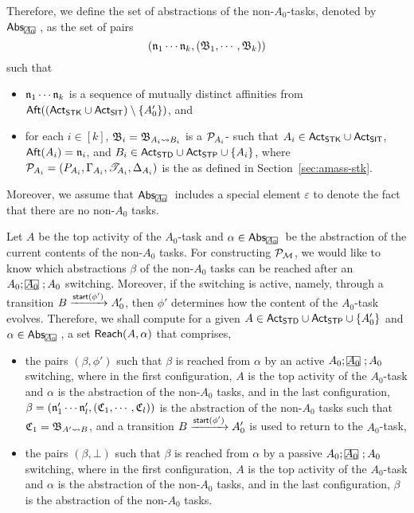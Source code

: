 Therefore, we define the set of abstractions of the non-$A_0$-tasks, denoted by $\abs_{\mhcancel{A_0}}$, as the set of pairs 
\[(\mathfrak{n}_1 \cdots \mathfrak{n}_k, ({\mathfrak{B} }_1, \cdots, {\mathfrak{B} }_k))\]
such that 
\begin{itemize}
\item $\mathfrak{n}_1 \cdots \mathfrak{n}_k$ is a sequence of mutually distinct affinities from ${\sf Aft}(({\sf Act}_{{\sf STK}} \cup {\sf Act}_{{\sf SIT}}) \setminus \{A'_0\})$, and 
%
\item for each $i \in [k]$, ${\mathfrak{B} }_i = {\mathfrak{B} }_{A_i \rightsquigarrow B_i}$ is a ${\mathcal{P} }_{A_i}$-{\WOTrNFA} such that $A_i \in {\sf Act}_{\sf STK} \cup {\sf Act}_{\sf SIT}$, ${\sf Aft}(A_i) = \mathfrak{n}_i$, and $B_i \in {\sf Act}_{\sf STD} \cup {\sf Act}_{\sf STP} \cup \{A_i\}$, where ${\mathcal{P} }_{A_i} = (P_{A_i}, \Gamma_{A_i}, {\mathscr{T} }_{A_i}, \Delta_{A_i})$ is the {\WOTrPDS} as defined in Section~\ref{sec:amass-stk}. 
\end{itemize}
Moreover, we assume that $\abs_{\mhcancel{A_0}}$ includes a special element $\varepsilon$ to denote the fact that there are no non-$A_0$ tasks. 

Let $A$ be the top activity of the $A_0$-task and $\alpha \in \abs_{\mhcancel{A_0}}$ be the abstraction of the current contents of the non-$A_0$ tasks. For constructing ${\mathcal{P} }_{{\mathcal{M} }}$, we would like to know which abstractions $\beta$ of the non-$A_0$ tasks can be reached after an $A_0;\mhcancel{A_0};A_0$ switching. Moreover, if the switching is active, namely, through a transition $B \xrightarrow{{\mathsf{start} }(\phi')} A'_0$, then $\phi'$ determines how the content of the $A_0$-task evolves. Therefore, we shall compute for a given $A \in {\sf Act}_{\sf STD} \cup {\sf Act}_{\sf STP} \cup \{A'_0\}$ and $\alpha \in \abs_{\mhcancel{A_0}}$, a set ${\sf Reach}(A, \alpha)$ that comprises, 
\begin{itemize}
\item the pairs $(\beta, \phi')$ such that $\beta$ is reached from $\alpha$ by an active $A_0;\mhcancel{A_0};A_0$ switching, where in the first configuration, $A$ is the top activity of the $A_0$-task and $\alpha$ is the abstraction of the non-$A_0$ tasks, and in the last configuration, $\beta = (\mathfrak{n}'_1\cdots \mathfrak{n}'_l, ({\mathfrak{C} }_1, \cdots, {\mathfrak{C} }_l))$ is the abstraction of the non-$A_0$ tasks such that ${\mathfrak{C} }_1 = {\mathfrak{B} }_{A' \rightsquigarrow B}$, and a transition $B \xrightarrow{{\mathsf{start} }(\phi')} A'_0$ is used to return to the $A_0$-task,  
%
\item the pairs $(\beta, \bot)$ such that $\beta$ is reached from $\alpha$ by a passive $A_0;\mhcancel{A_0};A_0$ switching, where in the first configuration, $A$ is the top activity of the $A_0$-task and $\alpha$ is the abstraction of the non-$A_0$ tasks, and in the last configuration, $\beta$ is the abstraction of the non-$A_0$ tasks. 
\end{itemize}

